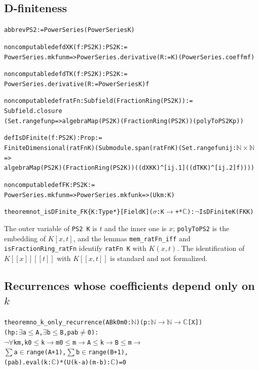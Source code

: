 \documentclass[11pt]{amsart}
\theoremstyle{definition}
\newcommand{\lean}[1]{\texttt{#1}}
\newcommand{\C}{\mathbb{C}}
\newcommand{\NN}{\mathbb{N}}
\begin{document}
\subsection*{D-finiteness}
\begin{alltt}\small
abbrev PS2 := PowerSeries (PowerSeries K)

noncomputable def dXK (f : PS2 K) : PS2 K :=
  PowerSeries.mk fun m => PowerSeries.derivative (R := K) (PowerSeries.coeff m f)

noncomputable def dTK (f : PS2 K) : PS2 K :=
  PowerSeries.derivative (R := PowerSeries K) f

noncomputable def ratFn : Subfield (FractionRing (PS2 K)) :=
  Subfield.closure
    (Set.range fun p => algebraMap (PS2 K) (FractionRing (PS2 K)) (polyToPS2 K p))

def IsDFinite (f : PS2 K) : Prop :=
  FiniteDimensional (ratFn K) (Submodule.span (ratFn K) (Set.range fun ij : \(\NN\times\NN\) =>
    algebraMap (PS2 K) (FractionRing (PS2 K)) ((dXK K)^[ij.1] ((dTK K)^[ij.2] f))))

noncomputable def FK : PS2 K :=
  PowerSeries.mk fun m => PowerSeries.mk fun k => (U k m : K)

theorem not_isDFinite_FK \{K : Type*\} [Field K] (\(\sigma\) : K \(\to\)+* \(\C\)) : \(\lnot\) IsDFinite K (FK K)
\end{alltt}
The outer variable of \lean{PS2 K} is $t$ and the inner one is $x$; \lean{polyToPS2} is the embedding of $K[x,t]$, and the lemmas \lean{mem\_ratFn\_iff} and \lean{isFractionRing\_ratFn} identify \lean{ratFn K} with $K(x,t)$. The identification of $K[[x]][[t]]$ with $K[[x,t]]$ is standard and not formalized.

\subsection*{Recurrences whose coefficients depend only on \texorpdfstring{$k$}{k}}
\begin{alltt}\small
theorem no_k_only_recurrence (A B k0 m0 : \(\NN\)) (p : \(\NN\) \(\to\) \(\NN\) \(\to\) \(\C\)[X])
    (hp : \(\exists\) a \(\le\) A, \(\exists\) b \(\le\) B, p a b \(\ne\) 0) :
    \(\lnot\) \(\forall\) k m, k0 \(\le\) k \(\to\) m0 \(\le\) m \(\to\) A \(\le\) k \(\to\) B \(\le\) m \(\to\)
      \(\sum\) a \(\in\) range (A + 1), \(\sum\) b \(\in\) range (B + 1),
        (p a b).eval (k : \(\C\)) * (U (k - a) (m - b) : \(\C\)) = 0
\end{alltt}
\end{document}
